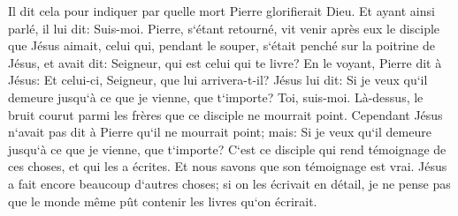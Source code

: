 \verse Il dit cela pour indiquer par quelle mort Pierre glorifierait Dieu. Et ayant ainsi parlé, il lui dit: Suis-moi. 
\verse Pierre, s`étant retourné, vit venir après eux le disciple que Jésus aimait, celui qui, pendant le souper, s`était penché sur la poitrine de Jésus, et avait dit: Seigneur, qui est celui qui te livre? 
\verse En le voyant, Pierre dit à Jésus: Et celui-ci, Seigneur, que lui arrivera-t-il? 
\verse Jésus lui dit: Si je veux qu`il demeure jusqu`à ce que je vienne, que t`importe? Toi, suis-moi. 
\verse Là-dessus, le bruit courut parmi les frères que ce disciple ne mourrait point. Cependant Jésus n`avait pas dit à Pierre qu`il ne mourrait point; mais: Si je veux qu`il demeure jusqu`à ce que je vienne, que t`importe? 
\verse C`est ce disciple qui rend témoignage de ces choses, et qui les a écrites. Et nous savons que son témoignage est vrai. 
\verse Jésus a fait encore beaucoup d`autres choses; si on les écrivait en détail, je ne pense pas que le monde même pût contenir les livres qu`on écrirait. 
